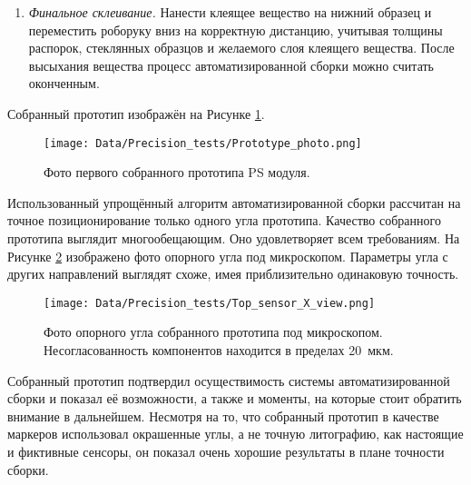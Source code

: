 \begin{enumerate}
\item \textit{Финальное склеивание.} Нанести клеящее вещество на нижний образец и переместить роборуку вниз на корректную дистанцию, учитывая толщины распорок, стеклянных образцов и желаемого слоя клеящего вещества. После высыхания вещества процесс автоматизированной сборки можно считать оконченным.
\end{enumerate}

Собранный прототип изображён на Рисунке \ref{fig:module_prototype}.

\begin{figure}[ht]\centering
\texttt{[image: Data/Precision\_tests/Prototype\_photo.png]}
\caption{Фото первого собранного прототипа PS модуля.}
\label{fig:module_prototype}
\end{figure}

Использованный упрощённый алгоритм автоматизированной сборки рассчитан на точное позиционирование только одного угла прототипа. Качество собранного прототипа выглядит многообещающим. Оно удовлетворяет всем требованиям. На Рисунке \ref{fig:prototype_macro} изображено фото опорного угла под микроскопом. Параметры угла с других направлений выглядят схоже, имея приблизительно одинаковую точность.

\begin{figure}[ht]\centering
\texttt{[image: Data/Precision\_tests/Top\_sensor\_X\_view.png]}
\caption{Фото опорного угла собранного прототипа под микроскопом. Несогласованность компонентов находится в пределах 20~мкм.}
\label{fig:prototype_macro}
\end{figure}

Собранный прототип подтвердил осуществимость системы автоматизированной сборки и показал её возможности, а также и моменты, на которые стоит обратить внимание в дальнейшем. Несмотря на то, что собранный прототип в качестве маркеров использовал окрашенные углы, а не точную литографию, как настоящие и фиктивные сенсоры, он показал очень хорошие результаты в плане точности сборки.
